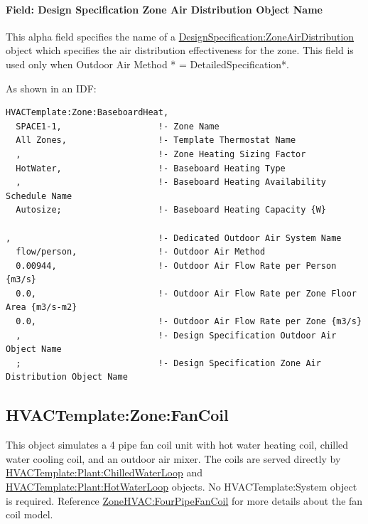 \paragraph{Field: Design Specification Zone Air Distribution Object Name}\label{field-design-specification-zone-air-distribution-object-name-000}

This alpha field specifies the name of a \hyperref[designspecificationzoneairdistribution]{DesignSpecification:ZoneAirDistribution} object which specifies the air distribution effectiveness for the zone. This field is used only when Outdoor Air Method * = DetailedSpecification*.

As shown in an IDF:

\begin{lstlisting}
HVACTemplate:Zone:BaseboardHeat,
  SPACE1-1,                   !- Zone Name
  All Zones,                  !- Template Thermostat Name
  ,                           !- Zone Heating Sizing Factor
  HotWater,                   !- Baseboard Heating Type
  ,                           !- Baseboard Heating Availability Schedule Name
  Autosize;                   !- Baseboard Heating Capacity {W}

,                             !- Dedicated Outdoor Air System Name
  flow/person,                !- Outdoor Air Method
  0.00944,                    !- Outdoor Air Flow Rate per Person {m3/s}
  0.0,                        !- Outdoor Air Flow Rate per Zone Floor Area {m3/s-m2}
  0.0,                        !- Outdoor Air Flow Rate per Zone {m3/s}
  ,                           !- Design Specification Outdoor Air Object Name
  ;                           !- Design Specification Zone Air Distribution Object Name
\end{lstlisting}

\subsection{HVACTemplate:Zone:FanCoil}\label{hvactemplatezonefancoil}

This object simulates a 4 pipe fan coil unit with hot water heating coil, chilled water cooling coil, and an outdoor air mixer. The coils are served directly by \hyperref[hvactemplateplantchilledwaterloop]{HVACTemplate:Plant:ChilledWaterLoop} and \hyperref[hvactemplateplanthotwaterloop]{HVACTemplate:Plant:HotWaterLoop} objects. No HVACTemplate:System object is required. Reference \hyperref[zonehvacfourpipefancoil]{ZoneHVAC:FourPipeFanCoil} for more details about the fan coil model.

